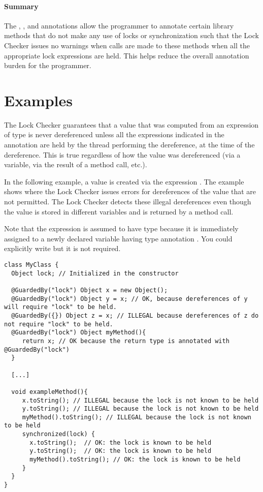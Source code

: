 \paragraph{Summary\label{lock-checker-library-methods-summary}}

The , , and
 annotations allow the programmer
to annotate certain library methods that do not make any use of
locks or synchronization such that the Lock Checker issues no
warnings when calls are made to these methods when all the
appropriate lock expressions are held.  This helps reduce the
overall annotation burden for the programmer.


\section{Examples\label{lock-examples}}

The Lock Checker guarantees that a value that was computed from an expression of  type is
never dereferenced unless all the expressions indicated in the
 annotation are held by the thread performing the
dereference, at the time of the dereference.  This is true regardless of how
the value was dereferenced (via a variable, via the result of a method call, etc.).

In the following example, a value is created via the expression
.  The example shows where the Lock Checker issues errors
for dereferences of the value that are not permitted.  The Lock Checker
detects these illegal dereferences even though the value is stored in
different variables and is returned by a method call.

Note that the expression  is assumed to have type 
because it is immediately assigned to a newly declared
variable having type annotation .  You could
explicitly write  but it is not
required.

\begin{Verbatim}
class MyClass {
  Object lock; // Initialized in the constructor

  @GuardedBy("lock") Object x = new Object();
  @GuardedBy("lock") Object y = x; // OK, because dereferences of y will require "lock" to be held.
  @GuardedBy({}) Object z = x; // ILLEGAL because dereferences of z do not require "lock" to be held.
  @GuardedBy("lock") Object myMethod(){
     return x; // OK because the return type is annotated with @GuardedBy("lock")
  }

  [...]

  void exampleMethod(){
     x.toString(); // ILLEGAL because the lock is not known to be held
     y.toString(); // ILLEGAL because the lock is not known to be held
     myMethod().toString(); // ILLEGAL because the lock is not known to be held
     synchronized(lock) {
       x.toString();  // OK: the lock is known to be held
       y.toString();  // OK: the lock is known to be held
       myMethod().toString(); // OK: the lock is known to be held
     }
  }
}
\end{Verbatim}


